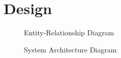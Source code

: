 \section{Design}

\begin{figure}[h]
    \begin{center}
        
    \end{center}
    \caption{Entity-Relationship Diagram}
    \label{fig:erd}
\end{figure}

\begin{figure}[h]
    \begin{center}
        
    \end{center}
    \caption{System Architecture Diagram}
    \label{fig:architecture}
\end{figure}
